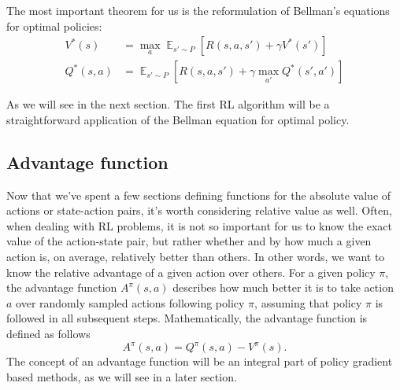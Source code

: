 The most important theorem for us is the reformulation of Bellman's equations for optimal policies:
\begin{align*}
    V^*(s) &= \max_a \mathop{\mathbb{E}}_{s' \sim P} [R(s,a,s') + \gamma V^*(s')] \\
    Q^*(s,a) &= \mathop{\mathbb{E}}_{s' \sim P} [R(s,a,s') + \gamma \max_{a'} Q^*(s',a')]
\end{align*}

As we will see in the next section. 
The first RL algorithm will be a straightforward application of the Bellman equation for optimal policy.

\subsection*{Advantage function}
Now that we've spent a few sections defining functions for the absolute value of actions or state-action pairs, it's worth considering relative value as well.
Often, when dealing with RL problems, it is not so important for us to know the exact value of the action-state pair, but rather whether and by how much a given action is, on average, relatively better than others.
In other words, we want to know the relative advantage of a given action over others.
For a given policy $\pi$, the advantage function $A^\pi(s,a)$ describes how much better it is to take action $a$ over randomly sampled actions following policy $\pi$, assuming that policy $\pi$ is followed in all subsequent steps.
Mathematically, the advantage function is defined as follows
$$A^\pi(s,a) = Q^\pi(s,a) - V^\pi(s).$$
The concept of an advantage function will be an integral part of policy gradient based methods, as we will see in a later section.




